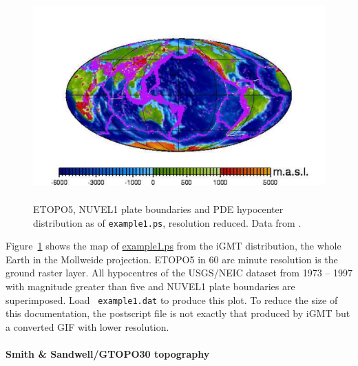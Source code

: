 \documentclass[11pt]{article}
\begin{document}
\begin{figure}
\centerline{\includegraphics[height=8cm]{./examples/example1}}
\caption{ETOPO5, NUVEL1 plate boundaries and PDE hypocenter
  distribution as of {\tt example1.ps}, 
  resolution reduced. Data from \cite{demets90,etopo5,usgsneic}. 
  \label{fig1}}
\end{figure}

Figure~\ref{fig1} shows the map of \url{example1.ps} from the iGMT
distribution, the whole Earth in the Mollweide projection. ETOPO5 in
60 arc minute resolution is the ground raster layer. All hypocentres
of the USGS/NEIC dataset from 1973 -- 1997 with magnitude greater than
five and NUVEL1 plate boundaries are superimposed. Load {\tt
  example1.dat} to produce this plot. To reduce the size of this
documentation, the postscript file is not exactly that produced by
iGMT but a converted GIF with lower resolution.

\paragraph{Smith \& Sandwell/GTOPO30 topography}
\end{document}
